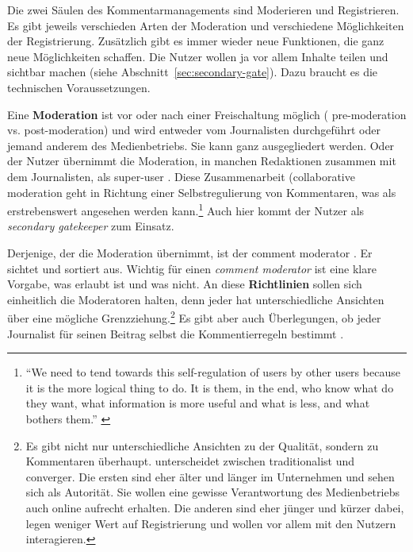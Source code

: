 Die zwei Säulen des Kommentarmanagements sind Moderieren und Registrieren. Es
gibt jeweils verschieden Arten der Moderation und verschiedene Möglichkeiten der
Registrierung. Zusätzlich gibt es immer wieder neue Funktionen, die ganz neue
Möglichkeiten schaffen.  Die Nutzer wollen ja vor allem Inhalte teilen und
sichtbar machen (siehe Abschnitt~\ref{sec:secondary-gate}).
Dazu braucht es die technischen Voraussetzungen.

Eine {\bfseries Moderation} ist vor oder nach einer Freischaltung möglich (\glqq
pre-moderation\grqq{} vs. \glqq post-moderation\grqq) und wird entweder vom
Journalisten durchgeführt oder jemand anderem des Medienbetriebs. Sie kann ganz
ausgegliedert werden. Oder der Nutzer übernimmt die Moderation, in manchen
Redaktionen zusammen mit dem Journalisten, als \glqq super-user\grqq{}
\autocite[S.~112]{reich}. Diese Zusammenarbeit (\glqq collaborative
moderation\grqq{} \autocite[S.~109]{reich} geht in Richtung einer
Selbstregulierung von Kommentaren, was als erstrebenswert angesehen werden
kann.\footnote{``We need to tend towards this self-regulation of users by other
users because it is the more logical thing to do. It is them, in the end, who
know what do they want, what information is more useful and what is less, and
what bothers them.'' \autocite[S.~112]{reich}} Auch hier kommt der Nutzer als
\emph{secondary gatekeeper} zum Einsatz.

Derjenige, der die Moderation übernimmt, ist der \glqq comment moderator\grqq{}
\autocite[S.~68]{paulussen}. Er sichtet und sortiert aus. Wichtig für einen
{\slshape comment moderator} ist eine klare Vorgabe, was erlaubt ist und was
nicht. An diese {\bfseries Richtlinien} sollen sich einheitlich die Moderatoren
halten, denn jeder hat unterschiedliche Ansichten über eine mögliche
Grenzziehung.\footnote{Es gibt nicht nur unterschiedliche Ansichten zu der
Qualität, sondern zu Kommentaren überhaupt. \textcite{robinson} unterscheidet
zwischen \glqq traditionalist\grqq{} und \glqq converger\grqq{}. Die ersten
sind eher älter und länger im Unternehmen und sehen sich als Autorität. Sie
wollen eine gewisse Verantwortung des Medienbetriebs auch online aufrecht
erhalten. Die anderen sind eher jünger und kürzer dabei, legen weniger Wert
auf Registrierung und wollen vor allem mit den Nutzern interagieren.} Es gibt
aber auch Überlegungen, ob jeder Journalist für seinen Beitrag selbst die
Kommentierregeln bestimmt \autocite[S.~127]{singer}.

